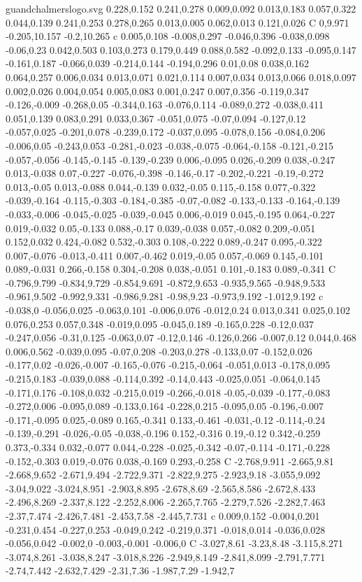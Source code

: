 \begin{filecontents}[noheader]{guandchalmerslogo.svg}
0.228,0.152 0.241,0.278 0.009,0.092 0.013,0.183 0.057,0.322 0.044,0.139 0.241,0.253 0.278,0.265 0.013,0.005 0.062,0.013 0.121,0.026 C 0,9.971 -0.205,10.157 -0.2,10.265 c 0.005,0.108 -0.008,0.297 -0.046,0.396 -0.038,0.098 -0.06,0.23 0.042,0.503 0.103,0.273 0.179,0.449 0.088,0.582 -0.092,0.133 -0.095,0.147 -0.161,0.187 -0.066,0.039 -0.214,0.144 -0.194,0.296 0.01,0.08 0.038,0.162 0.064,0.257 0.006,0.034 0.013,0.071 0.021,0.114 0.007,0.034 0.013,0.066 0.018,0.097 0.002,0.026 0.004,0.054 0.005,0.083 0.001,0.247 0.007,0.356 -0.119,0.347 -0.126,-0.009 -0.268,0.05 -0.344,0.163 -0.076,0.114 -0.089,0.272 -0.038,0.411 0.051,0.139 0.083,0.291 0.033,0.367 -0.051,0.075 -0.07,0.094 -0.127,0.12 -0.057,0.025 -0.201,0.078 -0.239,0.172 -0.037,0.095 -0.078,0.156 -0.084,0.206 -0.006,0.05 -0.243,0.053 -0.281,-0.023 -0.038,-0.075 -0.064,-0.158 -0.121,-0.215 -0.057,-0.056 -0.145,-0.145 -0.139,-0.239 0.006,-0.095 0.026,-0.209 0.038,-0.247 0.013,-0.038 0.07,-0.227 -0.076,-0.398 -0.146,-0.17 -0.202,-0.221 -0.19,-0.272 0.013,-0.05 0.013,-0.088 0.044,-0.139 0.032,-0.05 0.115,-0.158 0.077,-0.322 -0.039,-0.164 -0.115,-0.303 -0.184,-0.385 -0.07,-0.082 -0.133,-0.133 -0.164,-0.139 -0.033,-0.006 -0.045,-0.025 -0.039,-0.045 0.006,-0.019 0.045,-0.195 0.064,-0.227 0.019,-0.032 0.05,-0.133 0.088,-0.17 0.039,-0.038 0.057,-0.082 0.209,-0.051 0.152,0.032 0.424,-0.082 0.532,-0.303 0.108,-0.222 0.089,-0.247 0.095,-0.322 0.007,-0.076 -0.013,-0.411 0.007,-0.462 0.019,-0.05 0.057,-0.069 0.145,-0.101 0.089,-0.031 0.266,-0.158 0.304,-0.208 0.038,-0.051 0.101,-0.183 0.089,-0.341 C -0.796,9.799 -0.834,9.729 -0.854,9.691 -0.872,9.653 -0.935,9.565 -0.948,9.533 -0.961,9.502 -0.992,9.331 -0.986,9.281 -0.98,9.23 -0.973,9.192 -1.012,9.192 c -0.038,0 -0.056,0.025 -0.063,0.101 -0.006,0.076 -0.012,0.24 0.013,0.341 0.025,0.102 0.076,0.253 0.057,0.348 -0.019,0.095 -0.045,0.189 -0.165,0.228 -0.12,0.037 -0.247,0.056 -0.31,0.125 -0.063,0.07 -0.12,0.146 -0.126,0.266 -0.007,0.12 0.044,0.468 0.006,0.562 -0.039,0.095 -0.07,0.208 -0.203,0.278 -0.133,0.07 -0.152,0.026 -0.177,0.02 -0.026,-0.007 -0.165,-0.076 -0.215,-0.064 -0.051,0.013 -0.178,0.095 -0.215,0.183 -0.039,0.088 -0.114,0.392 -0.14,0.443 -0.025,0.051 -0.064,0.145 -0.171,0.176 -0.108,0.032 -0.215,0.019 -0.266,-0.018 -0.05,-0.039 -0.177,-0.083 -0.272,0.006 -0.095,0.089 -0.133,0.164 -0.228,0.215 -0.095,0.05 -0.196,-0.007 -0.171,-0.095 0.025,-0.089 0.165,-0.341 0.133,-0.461 -0.031,-0.12 -0.114,-0.24 -0.139,-0.291 -0.026,-0.05 -0.038,-0.196 0.152,-0.316 0.19,-0.12 0.342,-0.259 0.373,-0.334 0.032,-0.077 0.044,-0.228 -0.025,-0.342 -0.07,-0.114 -0.171,-0.228 -0.152,-0.303 0.019,-0.076 0.038,-0.169 0.293,-0.258 C -2.768,9.911 -2.665,9.81 -2.668,9.652 -2.671,9.494 -2.722,9.371 -2.822,9.275 -2.923,9.18 -3.055,9.092 -3.04,9.022 -3.024,8.951 -2.903,8.895 -2.678,8.69 -2.565,8.586 -2.672,8.433 -2.496,8.269 -2.337,8.122 -2.252,8.006 -2.265,7.765 -2.279,7.526 -2.282,7.463 -2.37,7.474 -2.426,7.481 -2.453,7.58 -2.445,7.731 c 0.009,0.152 -0.004,0.201 -0.231,0.454 -0.227,0.253 -0.049,0.242 -0.219,0.371 -0.018,0.014 -0.036,0.028 -0.056,0.042 -0.002,0 -0.003,-0.001 -0.006,0 C -3.027,8.61 -3.23,8.48 -3.115,8.271 -3.074,8.261 -3.038,8.247 -3.018,8.226 -2.949,8.149 -2.841,8.099 -2.791,7.771 -2.74,7.442 -2.632,7.429 -2.31,7.36 -1.987,7.29 -1.942,7 
\end{filecontents}

